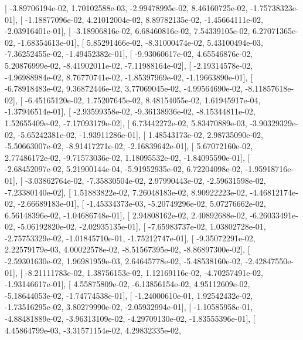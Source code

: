 \documentclass{article}
\begin{document}
       [ -3.89706194e-02,   1.70102588e-03,  -2.99478995e-02,
          8.46160725e-02,  -1.75738323e-01],
       [ -1.18877096e-02,   4.21012004e-02,   8.89782135e-02,
         -1.45664111e-02,  -2.03916401e-01],
       [ -3.18906816e-02,   6.68460816e-02,   7.54339105e-02,
          6.27071365e-02,  -1.68354613e-01],
       [  5.85291466e-02,  -8.31000474e-02,   5.43100494e-03,
         -7.36252455e-02,  -1.49452382e-01],
       [ -9.93060617e-02,   4.65546876e-02,   5.20876999e-02,
         -8.41902011e-02,  -7.11988164e-02],
       [ -2.19314578e-02,  -4.96988984e-02,   8.76770741e-02,
         -1.85397969e-02,  -1.19663890e-01],
       [ -6.78918483e-02,   9.36872446e-02,   3.77069045e-02,
         -4.99564690e-02,  -8.11857618e-02],
       [ -6.45165120e-02,   1.75207645e-02,   8.48154055e-02,
          1.61945917e-04,  -1.37946514e-01],
       [ -2.93599358e-02,  -9.36138936e-02,  -8.15344811e-02,
          1.52655409e-02,  -7.17093179e-02],
       [  6.73442272e-02,   5.83470889e-03,  -3.90329329e-02,
         -5.65242381e-02,  -1.93911286e-01],
       [  1.48543173e-02,   2.98735090e-02,  -5.50663007e-02,
         -8.91417271e-02,  -2.16839642e-01],
       [  5.67072160e-02,   2.77486172e-02,  -9.71573036e-02,
          1.18095532e-02,  -1.84095590e-01],
       [ -2.68452097e-02,   5.21900144e-04,  -5.91952935e-02,
          6.72204098e-02,  -1.95918716e-01],
       [ -3.03862764e-02,  -7.35830504e-02,   2.97990443e-02,
         -2.59631598e-02,  -7.23380140e-02],
       [  1.51883822e-02,   7.26048183e-02,   8.90922223e-02,
         -4.46812174e-02,  -2.66689183e-01],
       [ -1.45334373e-03,  -5.20749296e-02,   5.07276662e-02,
          6.56148396e-02,  -1.04686748e-01],
       [  2.94808162e-02,   2.40892688e-02,  -6.26033491e-02,
         -5.06192820e-02,  -2.02935135e-01],
       [ -7.65983737e-02,   1.03802728e-01,  -2.75753329e-02,
         -1.01845710e-01,  -1.75212747e-01],
       [ -9.35072291e-02,   2.22579179e-03,   4.00022578e-02,
         -8.51567395e-02,  -8.86897300e-02],
       [ -2.59301630e-02,   1.96981959e-03,   2.64645778e-02,
         -5.48538160e-02,  -2.42847550e-01],
       [ -8.21111783e-02,   1.38756153e-02,   1.12169116e-02,
         -4.70257491e-02,  -1.93146617e-01],
       [  4.55875809e-02,  -6.13856154e-02,   4.95112609e-02,
         -5.18644053e-02,  -1.74774538e-01],
       [ -1.24000610e-01,   1.92542432e-02,  -1.73516295e-02,
          3.80279990e-02,  -2.05932994e-01],
       [ -1.10585958e-01,  -4.88481889e-02,  -3.96313109e-02,
         -4.29709130e-02,  -1.83555396e-01],
       [  4.45864799e-03,  -3.31571154e-02,   4.29832335e-02,
\end{document}
